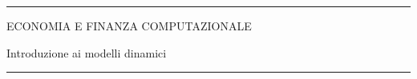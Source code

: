 \documentclass[12pt,aspectratio=169]{beamer}
\begin{document}
\begin{frame}
\unitlength 5mm

\begin{center}

\rule{\textwidth}{2pt}

\vskip3mm
ECONOMIA E FINANZA COMPUTAZIONALE

Introduzione ai modelli dinamici
\rule{\textwidth}{2pt}

\end{center}

\end{frame}


\end{document}
